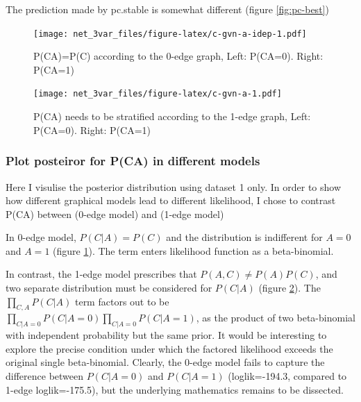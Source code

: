 \documentclass[]{article}
\theoremstyle{definition}
\theoremstyle{definition}
\theoremstyle{definition}
\theoremstyle{remark}
\begin{document}
The prediction made by pc.stable is somewhat different (figure
\ref{fig:pc-best})

\begin{figure}
\centering
\texttt{[image: net\_3var\_files/figure-latex/c-gvn-a-idep-1.pdf]}
\caption{\label{fig:c-gvn-a-idep}P(C\textbar{}A)=P(C) according to the
0-edge graph, Left: P(C\textbar{}A=0). Right: P(C\textbar{}A=1)}
\end{figure}

\begin{figure}
\centering
\texttt{[image: net\_3var\_files/figure-latex/c-gvn-a-1.pdf]}
\caption{\label{fig:c-gvn-a}P(C\textbar{}A) needs to be stratified according
to the 1-edge graph, Left: P(C\textbar{}A=0). Right: P(C\textbar{}A=1)}
\end{figure}

\subsubsection{Plot posteiror for P(C\textbar{}A) in different
models}\label{plot-posteiror-for-pca-in-different-models}

Here I visulise the posterior distribution using dataset 1 only. In
order to show how different graphical models lead to different
likelihood, I chose to contrast P(C\textbar{}A) between
\text{[A][B][C]}(0-edge model) and \text{[A][B][C|A]} (1-edge model)

In 0-edge model, \(P(C|A)=P(C)\) and the distribution is indifferent for
\(A=0\) and \(A=1\) (figure \ref{fig:c-gvn-a-idep}). The term enters
likelihood function as a beta-binomial.

In contrast, the 1-edge model prescribes that \(P(A,C)\neq P(A)P(C)\),
and two separate distribution must be considered for \(P(C|A)\) (figure
\ref{fig:c-gvn-a}). The \(\prod_{C,A} P(C|A)\) term factors out to be
\(\prod_{C|A=0} P(C|A=0)\prod_{C|A=0} P(C|A=1)\), as the product of two
beta-binomial with independent probability but the same prior. It would
be interesting to explore the precise condition under which the factored
likelihood exceeds the original single beta-binomial. Clearly, the
0-edge model fails to capture the difference between \(P(C|A=0)\) and
\(P(C|A=1)\) (loglik=-194.3, compared to 1-edge loglik=-175.5), but the
underlying mathematics remains to be dissected.
\end{document}
